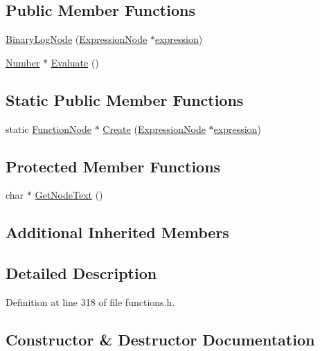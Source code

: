 \subsection*{Public Member Functions}
\begin{DoxyCompactItemize}
\item 
\hyperlink{classBinaryLogNode_aba9e8a080b194de67e58f19c3aef2433}{Binary\+Log\+Node} (\hyperlink{classExpressionNode}{Expression\+Node} $\ast$\hyperlink{classFunctionNode_ad7577b179a1937aaf8a0058bb5b546dc}{expression})
\item 
\hyperlink{structNumber}{Number} $\ast$ \hyperlink{classBinaryLogNode_a0ac91748d2e82ac41b3a86eca6cf51df}{Evaluate} ()
\end{DoxyCompactItemize}
\subsection*{Static Public Member Functions}
\begin{DoxyCompactItemize}
\item 
static \hyperlink{classFunctionNode}{Function\+Node} $\ast$ \hyperlink{classBinaryLogNode_a443a095bddfc93df884e96cf43c2e971}{Create} (\hyperlink{classExpressionNode}{Expression\+Node} $\ast$\hyperlink{classFunctionNode_ad7577b179a1937aaf8a0058bb5b546dc}{expression})
\end{DoxyCompactItemize}
\subsection*{Protected Member Functions}
\begin{DoxyCompactItemize}
\item 
char $\ast$ \hyperlink{classBinaryLogNode_ad530e3055e387682633eb4a055c4260f}{Get\+Node\+Text} ()
\end{DoxyCompactItemize}
\subsection*{Additional Inherited Members}


\subsection{Detailed Description}


Definition at line 318 of file functions.\+h.



\subsection{Constructor \& Destructor Documentation}
